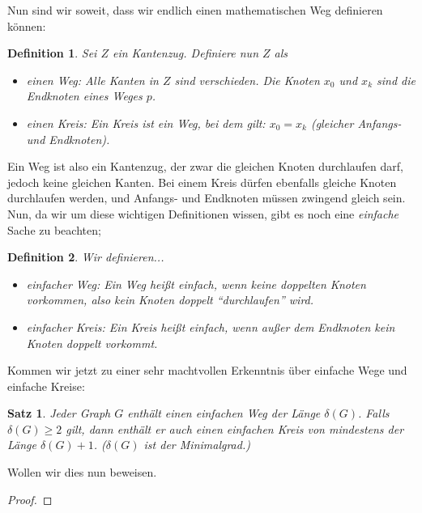 \documentclass{article}
\newtheorem{theorem}{Satz}
\newtheorem{definition}{Definition}
\begin{document}
\bigskip
Nun sind wir soweit, dass wir endlich einen mathematischen Weg definieren können:\\
\begin{definition}
	Sei $Z$ ein Kantenzug. Definiere nun $Z$ als
	\begin{itemize}
		\item einen \emph{Weg}: Alle Kanten in $Z$ sind verschieden. Die Knoten $x_0$ und $x_k$ sind die \emph{Endknoten} eines Weges $p$.
		\item einen \emph{Kreis}: Ein \emph{Kreis} ist ein Weg, bei dem gilt: $x_0 = x_k$ (gleicher Anfangs- und Endknoten).
	\end{itemize}
\end{definition}
\bigskip
Ein Weg ist also ein Kantenzug, der zwar die gleichen Knoten durchlaufen darf, jedoch keine gleichen Kanten. Bei einem Kreis dürfen ebenfalls gleiche Knoten durchlaufen werden, und Anfangs- und Endknoten müssen zwingend gleich sein.\\
\bigskip
Nun, da wir um diese wichtigen Definitionen wissen, gibt es noch eine \emph{einfache} Sache zu beachten;\\
\begin{definition}
	Wir definieren...
	\begin{itemize}
		\item \emph{einfacher Weg:} Ein Weg heißt \emph{einfach}, wenn keine doppelten Knoten vorkommen, also kein Knoten doppelt "`durchlaufen"' wird.
		\item \emph{einfacher Kreis:} Ein Kreis heißt \emph{einfach}, wenn außer dem Endknoten kein Knoten doppelt vorkommt.
	\end{itemize}
\end{definition}
Kommen wir jetzt zu einer sehr machtvollen Erkenntnis über einfache Wege und einfache Kreise:\\
\begin{theorem}
	Jeder Graph $G$ enthält einen einfachen Weg der Länge $\delta(G)$. Falls $\delta(G) \geq 2$ gilt, dann enthält er auch einen einfachen Kreis von mindestens der Länge $\delta(G) + 1$. ($\delta(G)$ ist der Minimalgrad.)
\end{theorem}
Wollen wir dies nun beweisen.\\
\begin{proof}
\end{proof}
\end{document}
